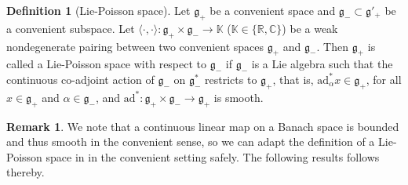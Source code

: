 \documentclass[11pt,reqno]{amsart}
\theoremstyle{definition}
\newtheorem{definition}[theorem]{Definition}
\newtheorem{remark}[theorem]{Remark}
\numberwithin{equation}{section}
\begin{document}
\begin{definition}[Lie-Poisson space]
Let $\mathfrak{g}_+$ be a convenient space and $\mathfrak{g}_- \subset \mathfrak{g}'_+$ be a convenient subspace. Let $\langle \cdot, \cdot \rangle: \mathfrak{g}_+ \times \mathfrak{g}_- \rightarrow \mathbb{K}$ ($\mathbb K\in \{\mathbb R, \mathbb C\}$) be a weak nondegenerate pairing between two convenient spaces $\mathfrak{g}_+$ and $\mathfrak{g}_-$. Then $\mathfrak{g}_+$ is called a Lie-Poisson space with respect to $\mathfrak{g}_-$ if $\mathfrak{g}_-$ is a Lie algebra such that the continuous co-adjoint action of $\mathfrak{g}_-$ on $\mathfrak{g}^*_-$ restricts to $\mathfrak{g}_+$, that is, $\text{ad}^*_{\alpha}x \in \mathfrak{g}_+$, for all $x \in \mathfrak{g}_+$ and $\alpha \in \mathfrak{g}_-$, and $\text{ad}^*: \mathfrak{g}_+ \times \mathfrak{g}_- \rightarrow \mathfrak{g}_+$ is smooth.
\end{definition}

\begin{remark}
We note that a continuous linear map on a Banach space is bounded and thus smooth in the convenient sense, so we can adapt the definition of a Lie-Poisson space in  \cite[Definition 3.12]{32} in the convenient setting safely. The following results follows thereby.
\end{remark}
\end{document}
